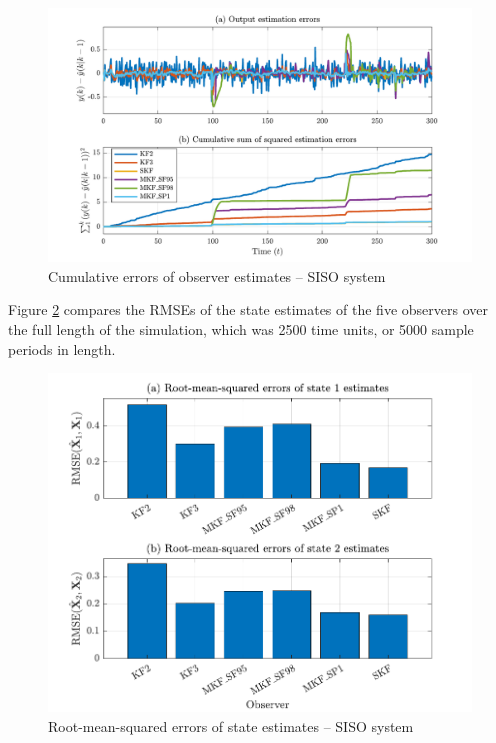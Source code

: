 \begin{figure}[htp]
	\centering
	\includegraphics[width=13cm]{images/rod_obs_sim1_all_seed_cum_err_y1.pdf}
	\caption{Cumulative errors of observer estimates – SISO system}
	\label{fig:rod-obs-sim1-cum-err-y1-all}
\end{figure}
Figure \ref{fig:rod-obs-sim1-xest-RMSE-bar} compares the RMSEs of the state estimates of the five observers over the full length of the simulation, which was 2500 time units, or 5000 sample periods in length.
\begin{figure}[htp]
	\centering
	\includegraphics[width=12cm]{images/rod_obs_sim1_all_seed_x_err_bar.pdf}
	\caption{Root-mean-squared errors of state estimates – SISO system}
	\label{fig:rod-obs-sim1-xest-RMSE-bar}
\end{figure}

